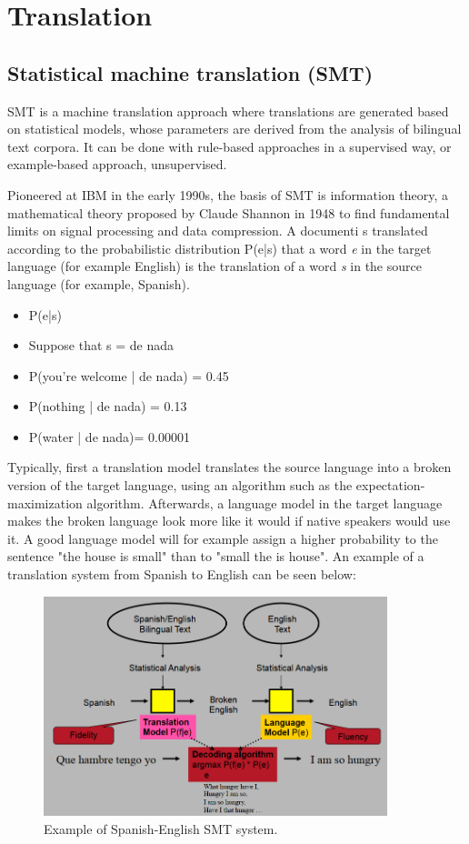 %
%

\chapter{Translation}\label{ch:translation}

\section{Statistical machine translation (SMT)}

SMT is a machine translation approach where translations are generated based on statistical models, whose parameters are derived from the analysis of bilingual text corpora. It can be done with rule-based approaches in a supervised way, or example-based approach, unsupervised.

Pioneered at IBM in the early 1990s, the basis of SMT is information theory, a mathematical theory proposed by Claude Shannon in 1948 to find fundamental limits on signal processing and data compression. A documenti s translated according to the probabilistic distribution P(e|s) that a word \emph{e} in the target language (for example English) is the translation of a word \emph{s} in the source language (for example, Spanish).

\begin{itemize}
	\item P(e|s)
	\item Suppose that s = de nada
	\item P(you're welcome | de nada) = 0.45
	\item P(nothing | de nada) = 0.13
	\item P(water | de nada)= 0.00001
\end{itemize}

Typically, first a translation model translates the source language into a broken version of the target language, using an algorithm such as the expectation-maximization algorithm. Afterwards, a language model in the target language makes the broken language look more like it would if native speakers would use it. A good language model will for example assign a higher probability to the sentence "the house is small" than to "small the is house". An example of a translation system from Spanish to English can be seen below:

\begin{figure}[!ht]
    \centering
    \includegraphics[width=10cm]{figures/smt.png}
    \caption{Example of Spanish-English SMT system.}
\end{figure}

